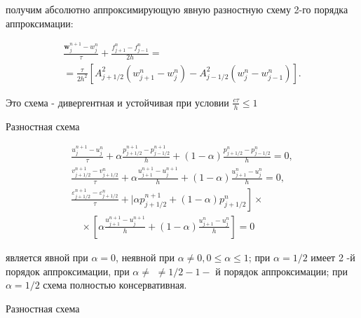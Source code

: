\documentclass[10pt]{article}
\begin{document}
получим абсолютно аппроксимирующую явную разностную схему 2-го порядка аппроксимации:



\[

\begin{gathered}

\frac{\boldsymbol{w}_{j}^{n+1}-w_{j}^{n}}{\tau}+\frac{f_{j+1}^{n}-f_{j-1}^{n}}{2 h}= \\

=\frac{\tau}{2 h^{2}}\left[A_{j+1 / 2}^{2}\left(w_{j+1}^{n}-w_{j}^{n}\right)-A_{j-1 / 2}^{2}\left(w_{j}^{n}-w_{j-1}^{n}\right)\right] .

\end{gathered}

\]



Это схема - дивергентная и устойчивая при условии $\frac{c \tau}{h} \leqslant 1$



Разностная схема



\[

\begin{gathered}

\frac{u_{j}^{n+1}-u_{j}^{n}}{\tau}+\alpha \frac{p_{j+1 / 2}^{n+1}-p_{j-1 / 2}^{n+1}}{h}+(1-\alpha) \frac{p_{j+1 / 2}^{n}-p_{j-1 / 2}^{n}}{h}=0, \\

\frac{v_{j+1 / 2}^{n+1}-v_{j+1 / 2}^{n}}{\tau}+\alpha \frac{u_{j+1}^{n+1}-u_{j}^{n+1}}{h}+(1-\alpha) \frac{u_{j+1}^{n}-u_{j}^{n}}{h}=0, \\

\left.\frac{\varepsilon_{j+1 / 2}^{n+1}-\varepsilon_{j+1 / 2}^{n}}{\tau}+\mid \alpha p_{j+1 / 2}^{n+1}+(1-\alpha) p_{j+1 / 2}^{n}\right] \times \\

\quad \times\left[\alpha \frac{u_{j+1}^{n+1}-u_{j}^{n+1}}{h}+(1-\alpha) \frac{u_{j+1}^{n}-u_{j}^{n}}{h}\right]=0

\end{gathered}

\]



является явной при $\alpha=0$, неявной при $\alpha \neq 0,0 \leqslant \alpha \leqslant 1$; при $\alpha=1 / 2$ имеет 2 -й порядок аппроксимации, при $\alpha \neq$ $\neq 1 / 2-1-$ й порядок аппроксимации; при $\alpha=1 / 2$ схема полностью консервативная.



Разностная схема
\end{document}
